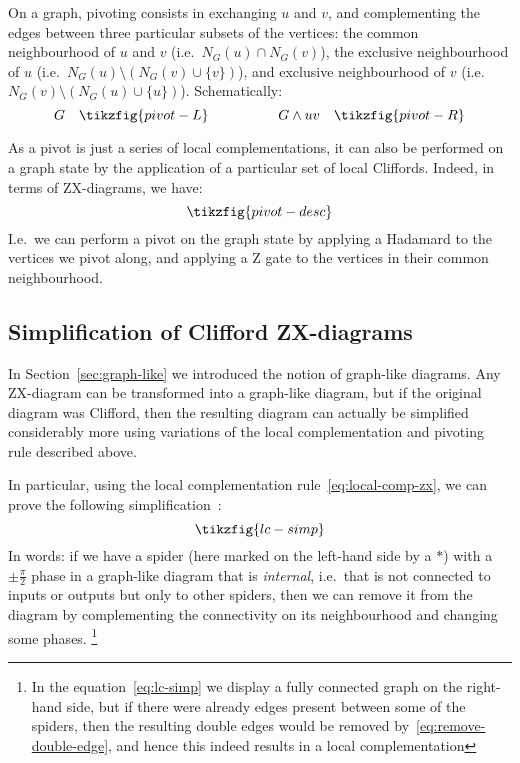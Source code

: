 \documentclass[a4paper,onecolumn,superscriptaddress,11pt,%
				unpublished,%
				allowfontchageintitle,%
				]{quantumarticle}
\begin{document}
On a graph, pivoting consists in exchanging $u$ and $v$, and complementing the edges
between three particular subsets of the vertices: the common neighbourhood of $u$ and $v$ (i.e.~$N_G(u)\cap N_G(v)$), the exclusive neighbourhood of $u$ (i.e.~$N_G(u)\setminus (N_G(v)\cup \{v\})$), and exclusive neighbourhood of $v$ (i.e.~$N_G(v)\setminus (N_G(u)\cup \{u\})$). Schematically:
\[G \quad\tikzfig{pivot-L}\qquad\qquad \quad G\wedge uv \quad\tikzfig{pivot-R}
\]

As a pivot is just a series of local complementations, it can also be performed on a graph state by the application of a particular set of local Cliffords. Indeed, in terms of ZX-diagrams, we have:
\begin{equation}\label{eq:pivot-zx}
\tikzfig{pivot-desc}
\end{equation}
I.e.~we can perform a pivot on the graph state by applying a Hadamard to the vertices we pivot along, and applying a Z gate to the vertices in their common neighbourhood.

\subsection{Simplification of Clifford ZX-diagrams}\label{sec:simp-clifford}

In Section~\ref{sec:graph-like} we introduced the notion of graph-like diagrams. Any ZX-diagram can be transformed into a graph-like diagram, but if the original diagram was Clifford, then the resulting diagram can actually be simplified considerably more using variations of the local complementation and pivoting rule described above.

In particular, using the local complementation rule~\eqref{eq:local-comp-zx}, we can prove the following simplification~\cite{cliffsimp}:
\begin{equation}\label{eq:lc-simp}
\tikzfig{lc-simp}
\end{equation}
In words: if we have a spider (here marked on the left-hand side by a $*$) with a $\pm\frac{\pi}{2}$ phase in a graph-like diagram that is \emph{internal}, i.e.~that is not connected to inputs or outputs but only to other spiders, then we can remove it from the diagram by complementing the connectivity on its neighbourhood and changing some phases.%
\footnote{In the equation~\eqref{eq:lc-simp} we display a fully connected graph on the right-hand side, but if there were already edges present between some of the spiders, then the resulting double edges would be removed by~\eqref{eq:remove-double-edge}, and hence this indeed results in a local complementation}
\end{document}
